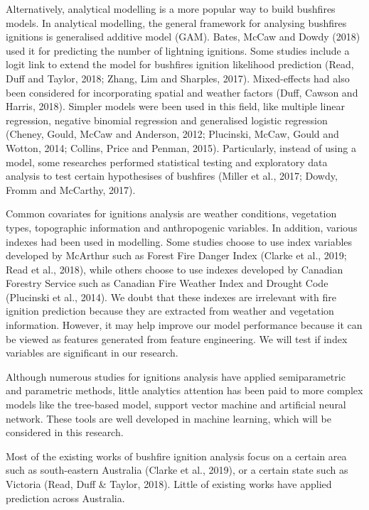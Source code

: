 \documentclass[11pt,a4paper,]{article}
\begin{document}
Alternatively, analytical modelling is a more popular way to build
bushfires models. In analytical modelling, the general framework for
analysing bushfires ignitions is generalised additive model (GAM).
Bates, McCaw and Dowdy (2018) used it for predicting the number of
lightning ignitions. Some studies include a logit link to extend the
model for bushfires ignition likelihood prediction (Read, Duff and
Taylor, 2018; Zhang, Lim and Sharples, 2017). Mixed-effects had also
been considered for incorporating spatial and weather factors (Duff,
Cawson and Harris, 2018). Simpler models were been used in this field,
like multiple linear regression, negative binomial regression and
generalised logistic regression (Cheney, Gould, McCaw and Anderson,
2012; Plucinski, McCaw, Gould and Wotton, 2014; Collins, Price and
Penman, 2015). Particularly, instead of using a model, some researches
performed statistical testing and exploratory data analysis to test
certain hypothesises of bushfires (Miller et al., 2017; Dowdy, Fromm and
McCarthy, 2017).

Common covariates for ignitions analysis are weather conditions,
vegetation types, topographic information and anthropogenic variables.
In addition, various indexes had been used in modelling. Some studies
choose to use index variables developed by McArthur such as Forest Fire
Danger Index (Clarke et al., 2019; Read et al., 2018), while others
choose to use indexes developed by Canadian Forestry Service such as
Canadian Fire Weather Index and Drought Code (Plucinski et al., 2014).
We doubt that these indexes are irrelevant with fire ignition prediction
because they are extracted from weather and vegetation information.
However, it may help improve our model performance because it can be
viewed as features generated from feature engineering. We will test if
index variables are significant in our research.

Although numerous studies for ignitions analysis have applied
semiparametric and parametric methods, little analytics attention has
been paid to more complex models like the tree-based model, support
vector machine and artificial neural network. These tools are well
developed in machine learning, which will be considered in this
research.

Most of the existing works of bushfire ignition analysis focus on a
certain area such as south-eastern Australia (Clarke et al., 2019), or a
certain state such as Victoria (Read, Duff \& Taylor, 2018). Little of
existing works have applied prediction across Australia.
\end{document}
